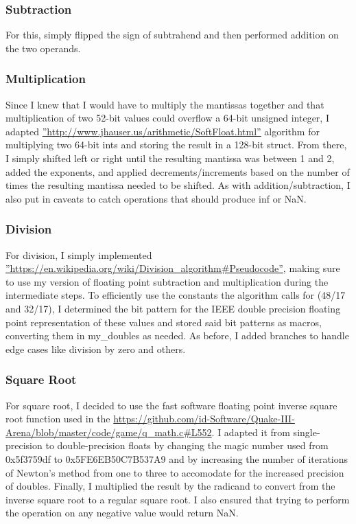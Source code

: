 \documentclass[12pt]{article}%
\begin{document}
\subsubsection{Subtraction}
For this, simply flipped the sign of subtrahend and then performed addition on the two operands.
\subsubsection{Multiplication}
Since I knew that I would have to multiply the mantissas together and that multiplication of two 52-bit values could overflow a 64-bit unsigned integer, I adapted \hyperref[John Hauser's Berkeley SoftFloat]{''http://www.jhauser.us/arithmetic/SoftFloat.html''} algorithm for multiplying two 64-bit ints and storing the result in a 128-bit struct. From there, I simply shifted left or right until the resulting mantissa was between 1 and 2, added the exponents, and applied decrements/increments based on the number of times the resulting mantissa needed to be shifted. As with addition/subtraction, I also put in caveats to catch operations that should produce inf or NaN.
\subsubsection{Division}
For division, I simply implemented \hyperref[Newton-Raphson division]{''https://en.wikipedia.org/wiki/Division_algorithm#Pseudocode''}, making sure to use my version of floating point subtraction and multiplication during the intermediate steps. To efficiently use the constants the algorithm calls for (48/17 and 32/17), I determined the bit pattern for the IEEE double precision floating point representation of these values and stored said bit patterns as macros, converting them in my_doubles as needed. As before, I added branches to handle edge cases like division by zero and others.
\subsubsection{Square Root}
For square root, I decided to use the fast software floating point inverse square root function used in the \hyperref[Quake III source]{https://github.com/id-Software/Quake-III-Arena/blob/master/code/game/q_math.c#L552}. I adapted it from single-precision to double-precision floats by changing the magic number used from 0x5f3759df to 0x5FE6EB50C7B537A9 and by increasing the number of iterations of Newton's method from one to three to accomodate for the increased precision of doubles. Finally, I multiplied the result by the radicand to convert from the inverse square root to a regular square root. I also ensured that trying to perform the operation on any negative value would return NaN.
\end{document}
